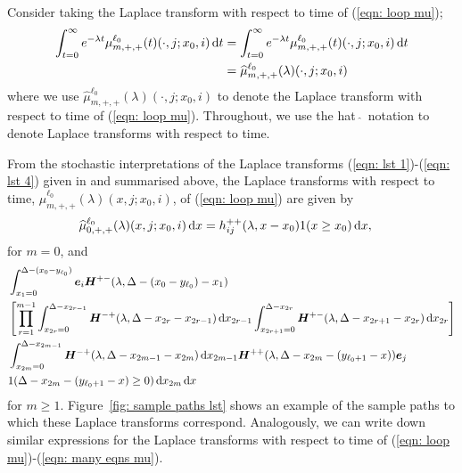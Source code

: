 Consider taking the Laplace transform with respect to time of (\ref{eqn: loop mu});
\begin{align}
	\int_{t=0}^\infty e^{-\lambda t} \mu^{\ell_0}_{m,+,+}(t)(\cdot, j; x_0,i)  \, \mathrm{d} t \nonumber 
	&= \int_{t=0}^\infty e^{-\lambda t} \mu^{\ell_0}_{m,+,+}(t)(\cdot, j; x_0,i)  \, \mathrm{d} t   \nonumber 
	\\&= \widehat \mu^{\ell_0}_{m,+,+}(\lambda)( \cdot, j; x_0,i)    \label{eqn: loop mu2}
\end{align}
where we use \(\widehat \mu^{\ell_0}_{m,+,+}(\lambda)( \cdot, j; x_0,i) \) to denote the Laplace transform with respect to time of (\ref{eqn: loop mu}). Throughout, we use the hat \(\,\widehat{}\,\)  notation to denote Laplace transforms with respect to time. 

From the stochastic interpretations of the Laplace transforms (\ref{eqn: lst 1})-(\ref{eqn: lst 4}) given in \citep{bean2005} and summarised above, the Laplace transforms with respect to time, \(\widehat \mu^{\ell_0}_{m,+,+}(\lambda)( x, j; x_0,i)\), of (\ref{eqn: loop mu}) are given by 
\begin{align*}
	\widehat \mu^{\ell_0}_{0,+,+}(\lambda)( x,j;x_0,i) \, \mathrm{d} x&= h_{ij}^{++}(\lambda,x-x_0)1(x\geq x_0)\, \mathrm{d} x,
\end{align*}
for \(m=0\),  and 
\begin{align}
	\nonumber&\int_{x_1 = 0}^{\Delta-(x_0-y_{\ell_0})} \boldsymbol e_i \boldsymbol H^{+-}(\lambda,\Delta-(x_0-y_{\ell_0})-x_1)  
	\\&  \nonumber\left[\prod_{r=1}^{m-1} \int_{x_{2r}=0}^{\Delta-x_{2r-1}} \boldsymbol H^{-+}(\lambda,\Delta-x_{2r}-x_{2r-1})\, \mathrm{d} x_{2r-1}\int_{x_{2r+1}=0}^{\Delta-x_{2r}}\boldsymbol H^{+-}(\lambda,\Delta-x_{2r+1}-x_{2r})\, \mathrm{d} x_{2r}\right]
	\\& \int_{x_{2m}=0}^{\Delta-x_{2m-1}} \boldsymbol H^{-+}(\lambda,\Delta -x_{2m-1} - x_{2m}) \, \mathrm{d} x_{2m-1}\boldsymbol H^{++}(\lambda,\Delta -x_{2m}- (y_{\ell_0+1}- x))\boldsymbol e_j \nonumber	
	\\& 1(\Delta-x_{2m}-(y_{\ell_0+1}-x)\geq 0)\, \mathrm{d} x_{2m} \, \mathrm{d} x \label{eqn: lst herwe}
\end{align} 
for \(m\geq 1\). Figure~\ref{fig: sample paths lst} shows an example of the sample paths to which these Laplace transforms correspond.  Analogously, we can write down similar expressions for the Laplace transforms with respect to time of (\ref{eqn: loop mu})-(\ref{eqn: many eqns mu}). 

